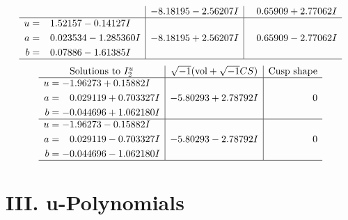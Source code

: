 \documentclass[1p]{elsarticle_modified}
\theoremstyle{definition}
\newcommand{\I}{\sqrt{-1}}
\begin{document}
$$\begin{array}{c|c|c}
 & -8.18195 - 2.56207 I & \phantom{-}0.65909 + 2.77062 I \\ \hline\begin{aligned}
u &= \phantom{-}1.52157 - 0.14127 I \\
a &= \phantom{-}0.023534 - 1.285360 I \\
b &= \phantom{-}0.07886 - 1.61385 I\end{aligned}
 & -8.18195 + 2.56207 I & \phantom{-}0.65909 - 2.77062 I\\
 \hline 
 \end{array}$$\newpage$$\begin{array}{c|c|c}  
\text{Solutions to }I^u_{2}& \I (\text{vol} + \sqrt{-1}CS) & \text{Cusp shape}\\
 \hline 
\begin{aligned}
u &= -1.96273 + 0.15882 I \\
a &= \phantom{-}0.029119 + 0.703327 I \\
b &= -0.044696 + 1.062180 I\end{aligned}
 & -5.80293 + 2.78792 I & \phantom{-0.000000 } 0 \\ \hline\begin{aligned}
u &= -1.96273 - 0.15882 I \\
a &= \phantom{-}0.029119 - 0.703327 I \\
b &= -0.044696 - 1.062180 I\end{aligned}
 & -5.80293 - 2.78792 I & \phantom{-0.000000 } 0\\
 \hline 
 \end{array}$$\newpage
\newpage\renewcommand{\arraystretch}{1}
\centering \section*{ III. u-Polynomials}
\end{document}

